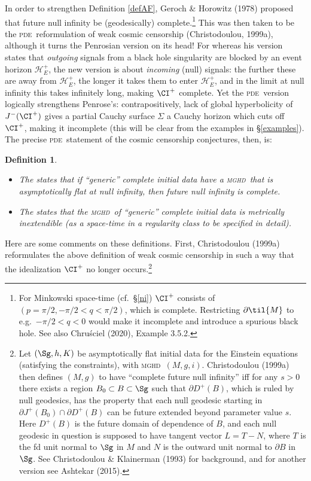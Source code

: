 \documentclass[12pt]{article}
\newcommand{\mghd}{\textsc{mghd}}
\newcommand{\pde}{\textsc{pde}}
\newcommand{\p}{\partial}
\newtheorem{definition}[theorem]{Definition}
\begin{document}
 In order  to 
 strengthen Definition \ref{defAF}, Geroch \& Horowitz (1978) proposed  that  future null infinity be (geodesically) complete.\footnote{For Minkowski space-time (cf.\ \S\ref{ni})
 $\CI^+$ consists of $(p=\pi/2,-\pi/2<q<\pi/2)$, which is complete. Restricting $\p\til{M}$ to e.g.\ $-\pi/2<q<0$ would  make it incomplete and introduce a spurious black hole. See also  Chru\'{s}ciel (2020), Example 3.5.2.}  This was then taken to be the 
 \pde\ reformulation of weak cosmic censorship  (Christodoulou, 1999a), although it turns the  Penrosian version on its head! For whereas his version states that \emph{outgoing} signals from a black hole singularity are blocked by an event horizon $\mathcal{H}^+_E$, the new version is about \emph{incoming} (null) signals: the further these are away from $\mathcal{H}^+_E$, the longer it takes them to enter $\mathcal{H}^+_E$, and in the limit at null infinity this takes infinitely long, making $\CI^+$ complete. 
Yet the \pde\ version logically strengthens Penrose's: 
 contrapositively,  lack of global hyperbolicity of $J^-(\CI^+)$ gives a partial Cauchy surface $\Sigma$ a Cauchy horizon which cuts off
 $\CI^+$, making it incomplete (this will be clear from the examples in \S\ref{examples}). 
 The precise \pde\ statement of the cosmic censorship conjectures, then, is:
\begin{definition}\label{CSfed1}
\begin{itemize}
\item The  states that if ``generic'' complete initial data have a \mghd\ that is asymptotically flat at null infinity, then  future null infinity is  complete.
\item The  states that the \mghd\ of ``generic'' complete initial data  is metrically inextendible (as a space-time in a regularity class to be specified in detail).\end{itemize}
\end{definition}
Here are some comments on these definitions. First, 
 Christodoulou (1999a) reformulates the above definition of weak cosmic censorship in such a way that the idealization $\CI^+$ no longer occurs.\footnote{
 Let $(\Sg,h,K)$ be asymptotically flat initial data for the Einstein equations (satisfying the constraints),  with \mghd\ $(M,g,i)$.
   Christodoulou (1999a) then defines $(M,g)$  to have ``complete future null infinity'' iff for any $s>0$ there exists a region $B_0\subset B\subset\Sg$ such that $\p D^+(B)$, which is ruled by null geodesics, has the property that each null geodesic starting 
 in $\p J^+(B_0)\cap \p D^+(B)$ can be future extended beyond parameter value  $s$. 
 Here $D^+(B)$ is the future domain of dependence of $B$,  and each null geodesic in question is supposed to have tangent vector $L=T-N$, where $T$ is the fd unit normal to $\Sg$ in $M$ and $N$ is the outward unit normal to $\p B$ in $\Sg$.
 See Christodoulou \& Klainerman (1993) for background, and
 for  another version see Ashtekar (2015). }
\end{document}
